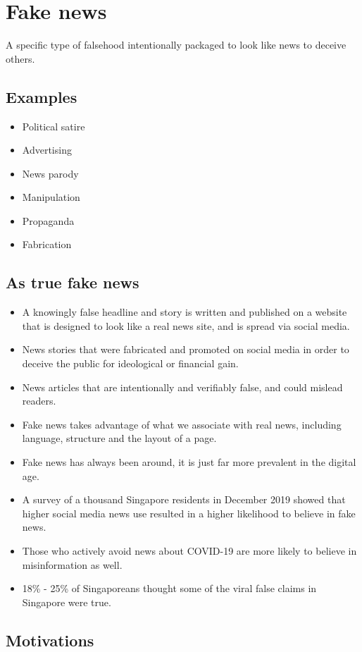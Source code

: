 \documentclass[11pt]{article}
\begin{document}
\clearpage
\section{Fake news}
\label{sec:org915b923}
A specific type of falsehood intentionally packaged to look like news to deceive others.
\subsection{Examples}
\label{sec:org973fd6c}
\begin{itemize}
\item Political satire
\item Advertising
\item News parody
\item Manipulation
\item Propaganda
\item Fabrication
\end{itemize}
\subsection{As true fake news}
\label{sec:orgd681ea7}
\begin{itemize}
\item A knowingly false headline and story is written and published on a website that is designed to look like a real news site, and is spread via social media.
\item News stories that were fabricated and promoted on social media in order to deceive the public for ideological or financial gain.
\item News articles that are intentionally and verifiably false, and could mislead readers.
\item Fake news takes advantage of what we associate with real news, including language, structure and the layout of a page.
\item Fake news has always been around, it is just far more prevalent in the digital age.
\item A survey of a thousand Singapore residents in December 2019 showed that higher social media news use resulted in a higher likelihood to believe in fake news.
\item Those who actively avoid news about COVID-19 are more likely to believe in misinformation as well.
\item 18\% - 25\% of Singaporeans thought some of the viral false claims in Singapore were true.
\end{itemize}
\subsection{Motivations}
\label{sec:orgf243ab0}
\end{document}
